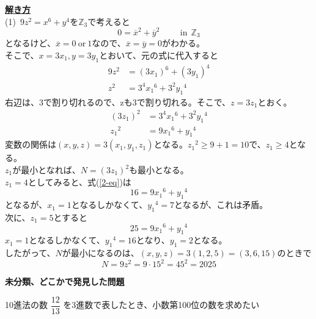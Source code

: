 \documentclass[11pt]{article}
\begin{document}
\underline{\textbf{解き方}}\\
(1)\ $9z^2 = x^6 + y^4$を$\mathbb{Z}_3$で考えると
\begin{equation*}
0= \overline{x}^2 + \overline{y}^2 \hspace{1cm} \mathrm{in} \ \ \mathbb{Z}_3
\end{equation*}
となるけど、$\overline{x} = 0\ \mathrm{or} \ 1$なので、$\overline{x}=\overline{y}=0$がわかる。\\
そこで、$x=3x_1 , y=3y_1$とおいて、元の式に代入すると\\
\begin{align*}
9z^2 &= {(3x_1)}^6 + {(3y_1)}^4\\
z^2 &= 3^4 {x_1}^6 + 3^2 {y_1}^4
\end{align*}
右辺は、3で割り切れるので、zも3で割り切れる。そこで、$z=3z_1$とおく。
\begin{align}
{(3z_1)}^2 &= 3^4 {x_1}^6 + 3^2 {y_1}^4 \nonumber \\
{z_1}^2 &= 9 {x_1}^6 + {y_1}^4 \label{2-eq}
\end{align}
変数の関係は$(x,y,z)=3(x_1 , y_1 , z_1)$となる。${z_1}^2 \geq 9+1 =10$で、$z_1 \geq 4$となる。\\
$z_1$が最小となれば、$N={(3z_1)}^2$も最小となる。\\
$z_1 = 4$としてみると、式(\ref{2-eq})は
\begin{equation*}
16 = 9 {x_1}^6 + {y_1}^4
\end{equation*}
となるが、$x_1=1$となるしかなくて、${y_1}^4 =7$となるが、これは矛盾。\\
次に、$z_1 = 5$とすると
\begin{equation*}
25 = 9 {x_1}^6 + {y_1}^4
\end{equation*}
$x_1=1$となるしかなくて、${y_1}^4 = 16$となり、$y_1=2$となる。\\
したがって、$N$が最小になるのは、$(x,y,z)=3(1,2,5)=(3,6,15)$のときで
\begin{equation*}
N=9z^2=9 \cdot 15^2 = 45^2 =2025
\end{equation*}

\newpage
\begin{center}
{\LARGE \textbf{未分類、どこかで発見した問題}}
\end{center}

\begin{tcolorbox}[mybox={駿台の整数完全攻略の見本画像より}]
10進法の数 $\dfrac{12}{13}$ を3進数で表したとき、小数第100位の数を求めたい
\end{tcolorbox}
\end{document}
